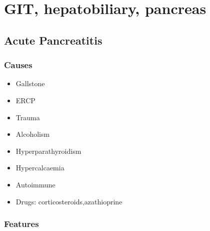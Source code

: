 \documentclass[
  12pt,
]{memoir}
\providecommand{\tightlist}{%
  \setlength{\itemsep}{0pt}\setlength{\parskip}{0pt}}
\begin{document}
\pagebreak

\hypertarget{git-hepatobiliary-pancreas}{%
\chapter{GIT, hepatobiliary,
pancreas}\label{git-hepatobiliary-pancreas}}

\hypertarget{acute-pancreatitis}{%
\section{Acute Pancreatitis}\label{acute-pancreatitis}}

\hypertarget{causes-1}{%
\subsection{Causes}\label{causes-1}}

\begin{itemize}
\tightlist
\item
  Gallstone
\item
  ERCP
\item
  Trauma
\item
  Alcoholism
\item
  Hyperparathyroidism
\item
  Hypercalcaemia
\item
  Autoimmune
\item
  Drugs: corticosteroids,azathioprine
\end{itemize}

\hypertarget{features-10}{%
\subsection{Features}\label{features-10}}
\end{document}
